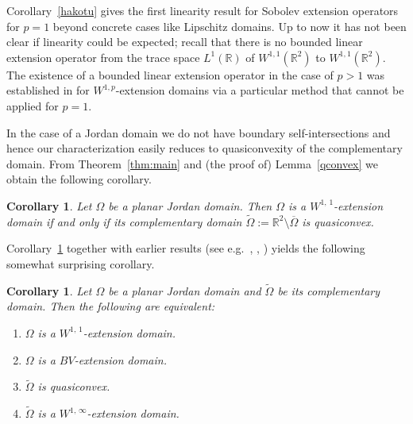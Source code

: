 \documentclass[reqno,11pt]{amsart}
\makeatletter
\def\rr{{\mathbb R}}
\def\dist{{\mathop\mathrm{\,dist\,}}}
\def\wz{\widetilde}
\newtheorem{cor}[thm]{Corollary}%
\numberwithin{equation}{section}
\theoremstyle{remark}
\makeatother
\begin{document}
Corollary~\ref{hakotu} gives the first linearity result for Sobolev extension
operators for $p=1$ beyond concrete cases like Lipschitz domains. 
Up to now it has not been clear if linearity could be expected; recall that
there is no bounded linear extension operator from the trace space  $L^1(\rr)$
of $W^{1,1}(\rr^2)$ to $W^{1,1}(\rr^2).$ 
The existence of a bounded linear extension operator in the case of $p>1$ 
was established in \cite{hakotu2008} for $W^{1,p}$-extension domains via
a particular method that cannot be applied for $p=1.$ 


In the case of a Jordan domain we do not have boundary self-intersections
and hence our characterization easily reduces to quasiconvexity of the 
complementary domain. From Theorem~\ref{thm:main} and (the proof of) Lemma~\ref{qconvex} we obtain the following corollary. 

\begin{cor}\label{mainthm}
Let $\Omega$ be a planar Jordan domain. Then $\Omega$ is a $W^{1,\,1}$-extension domain if and only if its complementary domain $\wz\Omega:=\mathbb R^2\setminus \overline{\Omega}$ is quasiconvex. 
\end{cor}

Corollary~\ref{mainthm} together with earlier results (see e.g.\ \cite{BM1967}, \cite{Z1999}, \cite{kosmirsha10}) yields the following 
somewhat surprising corollary.

\begin{cor}
Let $\Omega$ be a planar Jordan domain and $\wz \Omega$ be its 
complementary domain. Then the following are equivalent: 
\begin{enumerate}[(1) ]
\item $\Omega$ is a $W^{1,\,1}$-extension domain. 
\item $\Omega$ is a $BV$-extension domain. 
\item $\wz \Omega$ is quasiconvex. 
\item  $\wz \Omega$ is a $W^{1,\,\infty}$-extension domain. 
\end{enumerate}

\end{cor}
\end{document}

